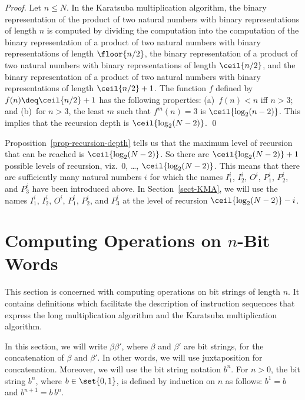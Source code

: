 \documentclass{llncs}
\begin{document}
\begin{proof}
Let $n \leq N$.
In the Karatsuba multiplication algorithm, the binary representation of 
the product of two natural numbers with binary representations of length 
$n$ is computed by dividing the computation into the computation of the 
binary representation of a product of two natural numbers with binary 
representations of length $\floor{n/2}$, the binary representation of a 
product of two natural numbers with binary representations of length 
$\ceil{n/2}$, and the binary representation of a product of two natural 
numbers with binary representations of length $\ceil{n/2} + 1$.
The function $f$ defined by $f(n) \deq \ceil{n/2} + 1$ has the following
properties: (a)~$f(n) < n$ iff $n > 3$; and (b)~for $n > 3$, the least 
$m$ such that $f^m(n) = 3$ is $\ceil{\log_2(n-2)}$.
This implies that the recursion depth is $\ceil{\log_2(N-2)}$.
\qed
\end{proof}
Proposition~\ref{prop-recursion-depth} tells us that the maximum level 
of recursion that can be reached is $\ceil{\log_2(N-2)}$.
So there are $\ceil{\log_2(N-2)} + 1$ possible levels of recursion, 
\linebreak[2] viz.\ $0$, \ldots, $\ceil{\log_2(N-2)}$.
This means that there are sufficiently many natural numbers $i$ for 
which the names $I_1^i$, $I_2^i$, $O^i$, $P_1^i$, $P_2^i$, and $P_3^i$ 
have been introduced above.
In Section~\ref{sect-KMA}, we will use the names $I_1^i$, $I_2^i$, 
$O^i$, $P_1^i$, $P_2^i$, and $P_3^i$ at the level of recursion 
$\ceil{\log_2(N-2)} - i$.

\section{Computing Operations on $n$-Bit Words}
\label{sect-opns-words}

This section is concerned with computing operations on bit strings of 
length $n$.
It contains definitions which facilitate the description of instruction 
sequences that express the long multiplication algorithm and the 
Karatsuba multiplication algorithm.

In this section, we will write $\beta \beta'$, where $\beta$ and 
$\beta'$ are bit strings, for the concatenation of $\beta$ and $\beta'$.
In other words, we will use juxtaposition for concatenation.
Moreover, we will use the bit string notation $b^n$.
For $n > 0$, the bit string $b^n$, where $b \in \set{0,1}$, is defined 
by induction on $n$ as follows: $b^1 = b$ and $b^{n+1} = b\,b^n$.
\end{document}
